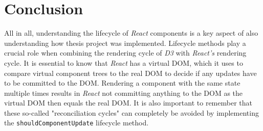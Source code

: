 \section{Conclusion}

All in all, understanding the lifecycle of \emph{React} components is a key aspect of also understanding how thesis project was implemented. Lifecycle methods play a crucial role when combining the rendering cycle of \emph{D3} with \emph{React's} rendering cycle. It is essential to know that \emph{React} has a virtual DOM, which it uses to compare virtual component trees to the real DOM to decide if any updates have to be committed to the DOM. Rendering a component with the same state multiple times results in \emph{React} not committing anything to the DOM as the virtual DOM then equals the real DOM. It is also important to remember that these so-called "reconciliation cycles" can completely be avoided by implementing the \texttt{shouldComponentUpdate} lifecycle method.






